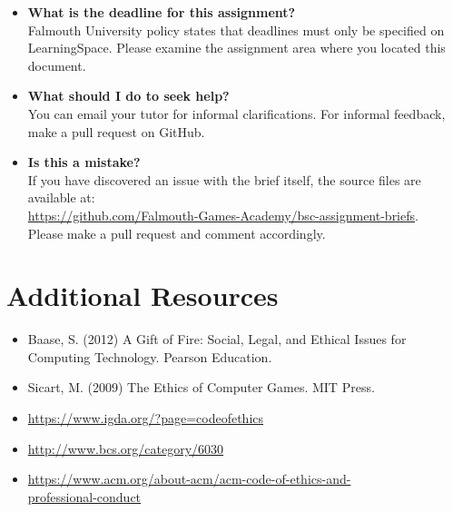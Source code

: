 \documentclass{../fal_assignment}
\begin{document}
\begin{itemize}
	\item 	\textbf{What is the deadline for this assignment?} \\ 
    		Falmouth University policy states that deadlines must only be specified on LearningSpace. Please examine the assignment area where you located this document.
    		
	\item 	\textbf{What should I do to seek help?} \\ 
    		You can email your tutor for informal clarifications. For informal feedback, make a pull request on GitHub. 
    		
    	\item 	\textbf{Is this a mistake?} \\ 	
    		If you have discovered an issue with the brief itself, the source files are available at: \\
    		\url{https://github.com/Falmouth-Games-Academy/bsc-assignment-briefs}.\\
    		 Please make a pull request and comment accordingly.
\end{itemize}

\section*{Additional Resources}

\begin{itemize}
    \item Baase, S. (2012) A Gift of Fire: Social, Legal, and Ethical Issues for Computing Technology. Pearson Education.
    \item Sicart, M. (2009) The Ethics of Computer Games. MIT Press.
    \item \url{https://www.igda.org/?page=codeofethics}
    \item \url{http://www.bcs.org/category/6030}
    \item \url{https://www.acm.org/about-acm/acm-code-of-ethics-and-} \\ \url{professional-conduct}
\end{itemize}

\rubricyeartwo
\end{document}
